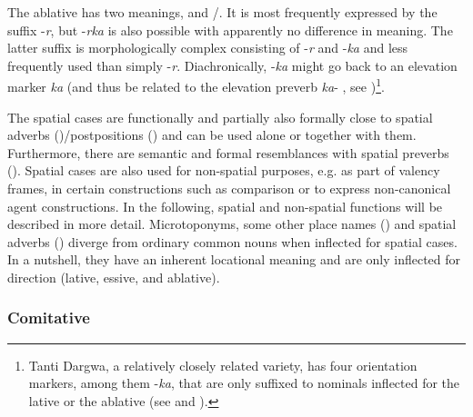 The ablative has two meanings,  and \slash{}. It is most frequently expressed by the suffix -\textit{r}, but -\textit{rka} is also possible with apparently no difference in meaning. The latter suffix is morphologically complex consisting of -\textit{r} and -\textit{ka} and less frequently used than simply -\textit{r}. Diachronically, -\textit{ka} might go back to an elevation marker \textit{ka}  (and thus be related to the elevation preverb \textit{ka}- , see )\footnote{Tanti Dargwa, a relatively closely related variety, has four orientation markers, among them -\textit{ka}, that are only suffixed to nominals inflected for the lative or the ablative (see \citealp[69]{Sumbatova.Lander2014} and \citet{ForkerLTSanzhi}).}. 

The spatial cases are functionally and partially also formally close to spatial adverbs ()\slash postpositions () and can be used alone or together with them. Furthermore, there are semantic and formal resemblances with spatial preverbs (). Spatial cases are also used for non-spatial purposes, e.g. as part of valency frames, in certain constructions such as comparison or to express non-canonical agent constructions. In the following, spatial and non-spatial functions will be described in more detail. Microtoponyms, some other place names () and spatial adverbs () diverge from ordinary common nouns when inflected for spatial cases. In a nutshell, they have an inherent locational meaning and are only inflected for direction (lative, essive, and ablative).



\subsubsection{Comitative}
\label{sssec:Comitative}

